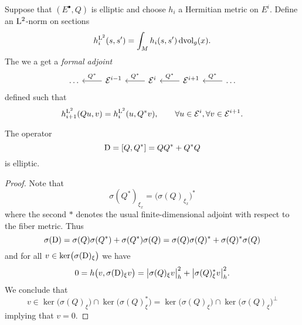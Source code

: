 Suppose that $(E^\bullet, Q)$ is elliptic and choose $h_i$ a Hermitian metric on $E^i$.
Define an $\mathrm{L}^2$-norm on sections
\begin{equation*}
  h_i^{\mathrm{L}^2}(s, s')
  = \int_M h_i (s, s') \, \mathrm{d} \text{vol}_g (x).
\end{equation*}
The we a get a \textit{formal adjoint}
\begin{equation*}
  \begin{tikzcd}
    \dots &
    \Ecal^{i-1} \arrow[l, swap, "Q^*"] &
    \Ecal^{i} \arrow[l, swap, "Q^*"] &
    \Ecal^{i+1} \arrow[l, swap, "Q^*"] &
    \dots \arrow[l, swap, "Q^*"]
  \end{tikzcd}
\end{equation*}
defined such that
\begin{equation*}
  h_{i+1}^{\mathrm{L}^2}(Q u, v) = h_i^{\mathrm{L}^2} (u, Q^* v), \qquad
  \forall u \in \mathcal{E}^{i}, \forall v \in \mathcal{E}^{i+1}.
\end{equation*}

\begin{lemma}
  The operator
  \begin{equation*}
    \mathrm{D} = [Q, Q^*] = Q Q^* + Q^* Q
  \end{equation*}
  is elliptic.
\end{lemma}
\begin{proof}
  Note that
  \begin{equation*}
    \sigma(Q^*)_{\xi_x} = \bigl( \sigma(Q)_{\xi_x} \bigr)^*
  \end{equation*}
  where the second $*$ denotes the usual finite-dimensional adjoint with respect to the fiber metric.
  Thus
  \begin{equation*}
    \sigma(\mathrm{D})
    = \sigma(Q) \sigma(Q^*) + \sigma(Q^*) \sigma(Q) \\
    = \sigma(Q) \sigma(Q)^* + \sigma(Q)^* \sigma(Q)
  \end{equation*}
  and for all $v \in \ker \bigl( \sigma(\mathrm{D})_\xi \bigr)$ we have
  \begin{equation*}
    0 = h\bigl(v, \sigma(\mathrm{D})_\xi v \bigr)
    = \bigl| \sigma(Q)_\xi  v \bigr|_h^2 + \bigl| \sigma(Q)_\xi^* v \bigr|_h^2.
  \end{equation*}
  We conclude that
  \begin{equation*}
    v \in \ker \bigl( \sigma(Q)_\xi \bigr) \cap
    \ker \bigl( \sigma(Q)_\xi^* \bigr)
    = \ker \bigl( \sigma(Q)_\xi \bigr) \cap
    \ker \bigl( \sigma(Q)_\xi \bigr)^\perp
  \end{equation*}
  implying that $v = 0$.
\end{proof}
